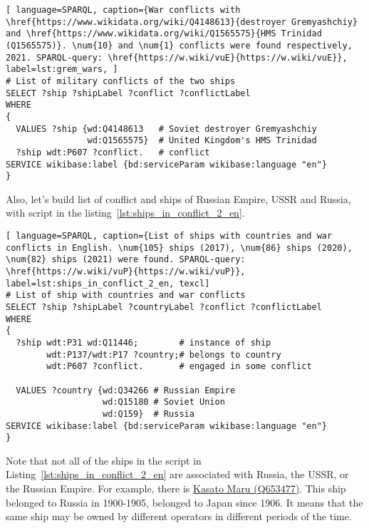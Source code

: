 \begin{lstlisting}[ language=SPARQL, caption={War conflicts with \href{https://www.wikidata.org/wiki/Q4148613}{destroyer Gremyashchiy} and \href{https://www.wikidata.org/wiki/Q1565575}{HMS Trinidad (Q1565575)}. \num{10} and \num{1} conflicts were found respectively, 2021. SPARQL-query: \href{https://w.wiki/vuE}{https://w.wiki/vuE}}, label=lst:grem_wars, ]
# List of military conflicts of the two ships 
SELECT ?ship ?shipLabel ?conflict ?conflictLabel
WHERE
{
  VALUES ?ship {wd:Q4148613   # Soviet destroyer Gremyashchiy
                wd:Q1565575}  # United Kingdom's HMS Trinidad
  ?ship wdt:P607 ?conflict.   # conflict
SERVICE wikibase:label {bd:serviceParam wikibase:language "en"}
}
\end{lstlisting}

\label{question:ship_3}

Also, let's build list of conflict and ships of Russian Empire, USSR and Russia, with script in the listing~\ref{lst:ships_in_conflict_2_en}.

\begin{lstlisting}[ language=SPARQL, caption={List of ships with countries and war conflicts in English. \num{105} ships (2017), \num{86} ships (2020), \num{82} ships (2021) were found. SPARQL-query: \href{https://w.wiki/vuP}{https://w.wiki/vuP}}, label=lst:ships_in_conflict_2_en, texcl]
# List of ship with countries and war conflicts
SELECT ?ship ?shipLabel ?countryLabel ?conflict ?conflictLabel
WHERE
{
  ?ship wdt:P31 wd:Q11446;        # instance of ship
        wdt:P137/wdt:P17 ?country;# belongs to country
        wdt:P607 ?conflict.       # engaged in some conflict
  
  VALUES ?country {wd:Q34266 # Russian Empire
                   wd:Q15180 # Soviet Union
                   wd:Q159}  # Russia
SERVICE wikibase:label {bd:serviceParam wikibase:language "en"}
}
\end{lstlisting}

Note that not all of the ships in the script in Listing~\ref{lst:ships_in_conflict_2_en} are associated with Russia, the USSR, or the Russian Empire. For example, there is \href{https://www.wikidata.org/wiki/Q653477}{Kasato Maru (Q653477)}. This ship belonged to Russia in 1900-1905, belonged to Japan since 1906. It means that the same ship may be owned by different operators in different periods of the time.


